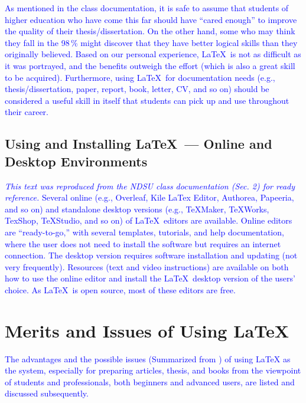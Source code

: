 \documentclass[phd,showframe]{ndsu-thesis-2022}
\newcommand\italk[1]{\textcolor{blue}{#1}}  %
\newcommand\lx{\LaTeX\xspace}
\begin{document}
\italk{As mentioned in the class documentation, it is safe to assume that students of higher education who have come this far should have ``cared enough'' to improve the quality of their thesis/dissertation. On the other hand, some who may think they fall in the 98\,\% might discover that they have better logical skills than they originally believed. Based on our personal experience, \LaTeX\ is not as difficult as it was portrayed, and the benefits outweigh the effort (which is also a great skill to be acquired). Furthermore, using \LaTeX\ for documentation needs (e.g., thesis/dissertation, paper, report, book, letter, CV, and so on) should be considered a useful skill in itself that students can pick up and use throughout their career. 
} 

\subsection{Using and Installing \LaTeX\  --- Online and Desktop Environments}  
\italk{\emph{This text was reproduced from the NDSU class documentation (Sec. 2) for ready reference.} Several online (e.g., Overleaf, Kile LaTex Editor, Authorea, Papeeria, and so on) and standalone desktop versions (e.g., TeXMaker, TeXWorks, TexShop, TeXStudio, and so on) of \LaTeX\ editors are available. Online editors are ``ready-to-go,'' with several templates, tutorials, and help documentation, where the user does not need to install the software but requires an internet connection. The desktop version requires software installation and updating (not very frequently). Resources (text and video instructions) are available on both how to use the online editor and install the \LaTeX\ desktop version of the users' choice. As \LaTeX\ is open source, most of these editors are free.}

\kant[9]

\section{Merits and Issues of Using \lx}
\italk{The advantages and the possible issues (Summarized from \citet{cannayen2011latex}) of using \lx as the system, especially for preparing articles, thesis, and books from the viewpoint of students and professionals, both beginners and advanced users, are listed and discussed subsequently.} 
\end{document}
